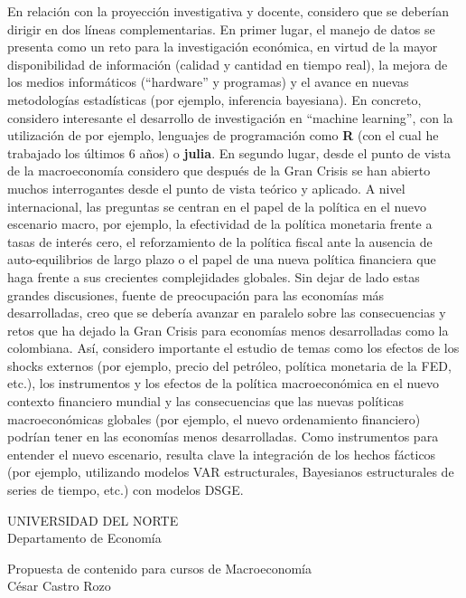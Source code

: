 \documentclass{article}\usepackage[]{graphicx}\usepackage[]{color}
\begin{document}
En relación con la proyección investigativa y docente, considero que se deberían dirigir en dos líneas complementarias. En primer lugar, el manejo de datos se presenta como un reto para la investigación económica, en virtud de la mayor disponibilidad de información (calidad y cantidad en tiempo real), la mejora de los medios informáticos (``hardware'' y programas) y el avance en nuevas metodologías estadísticas (por ejemplo, inferencia bayesiana). En concreto, considero interesante el desarrollo de investigación en ``machine learning'', con la utilización de por ejemplo, lenguajes de programación como \textbf{\textsf{R}} (con el cual he trabajado los últimos 6 años) o \textbf{julia}. En segundo lugar, desde el punto de vista de la macroeconomía considero que después de la Gran Crisis se han abierto muchos interrogantes desde el punto de vista teórico y aplicado. A nivel internacional, las preguntas se centran en el papel de la política en el nuevo escenario macro, por ejemplo, la efectividad de la política monetaria frente a tasas de interés cero, el reforzamiento de la política fiscal ante la ausencia de auto-equilibrios de largo plazo o el papel de una nueva política financiera que haga frente a sus crecientes complejidades globales. Sin dejar de lado estas grandes discusiones, fuente de preocupación para las economías más desarrolladas, creo que se debería avanzar en paralelo sobre las consecuencias y retos que ha dejado la Gran Crisis para economías menos desarrolladas como la colombiana. Así, considero importante el estudio de temas como los efectos de los shocks externos (por ejemplo, precio del petróleo, política monetaria de la FED, etc.), los instrumentos y los efectos de la política macroeconómica en el nuevo contexto financiero mundial y las consecuencias que las nuevas políticas macroeconómicas globales (por ejemplo, el nuevo ordenamiento financiero) podrían tener en las economías menos desarrolladas. Como instrumentos para entender el nuevo escenario, resulta clave la integración de los hechos fácticos (por ejemplo, utilizando modelos VAR estructurales, Bayesianos estructurales de series de tiempo, etc.) con modelos DSGE.

\clearpage{}

UNIVERSIDAD DEL NORTE\\
Departamento de Economía\\
\vspace{10pt}

Propuesta de contenido para cursos de Macroeconomía\\
César Castro Rozo
\vspace{10pt}
\end{document}
